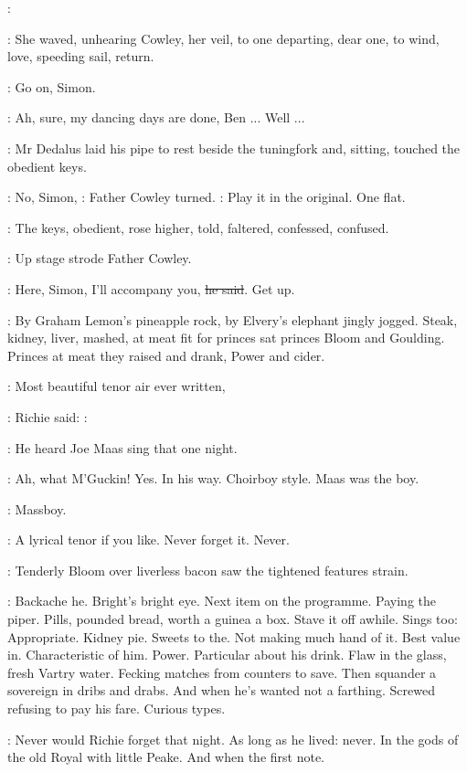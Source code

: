 \cowley:

:
She waved,
unhearing Cowley,
her veil,
to one departing,
dear one,
to
wind,
love,
speeding sail,
return.

\dollard:
Go on,
Simon.

\simon:
Ah,
sure,
my dancing days are done,
Ben ...
Well ...

:
Mr Dedalus laid his pipe to rest beside the tuningfork
and,
sitting,
touched the obedient keys.

\cowley:
No,
Simon,
:
Father Cowley turned.
\cowley:
Play it in the original.
One flat.

:
The keys,
obedient,
rose higher,
told,
faltered,
confessed,
confused.

:
Up stage strode Father Cowley.

\cowley:
Here,
Simon,
I'll accompany you,
\sout{he said}.
Get up.

:
By Graham Lemon's pineapple rock,
by Elvery's elephant jingly
jogged.
Steak,
kidney,
liver,
mashed,
at meat fit for princes sat princes
Bloom and Goulding.
Princes at meat they raised and drank,
Power and
cider.

\goulding:
Most beautiful tenor air ever written,

:
Richie said:
\goulding:

:
He heard Joe Maas sing that one night.

\goulding:
Ah,
what M'Guckin!
Yes.
In his way.
Choirboy style.
Maas was the boy.

\BloomInt:
Massboy.

\goulding:
A lyrical tenor if you like.
Never forget it.
Never.

:
Tenderly Bloom over liverless bacon saw
the tightened features strain.

\BloomInt:
Backache he.
Bright's bright eye.
Next item on the programme.
Paying the
piper.
Pills,
pounded bread,
worth a guinea a box.
Stave it off awhile.
Sings too:
Appropriate.
Kidney pie.
Sweets to
the.
Not making much hand of it.
Best value in.
Characteristic of him.
Power.
Particular about his drink.
Flaw in the glass,
fresh Vartry water.
Fecking matches from counters to save.
Then squander a sovereign in dribs
and drabs.
And when he's wanted not a farthing.
Screwed refusing to pay
his fare.
Curious types.

:
Never would Richie forget that night.
As long as he lived:
never.
In
the gods of the old Royal with little Peake.
And when the first note.

